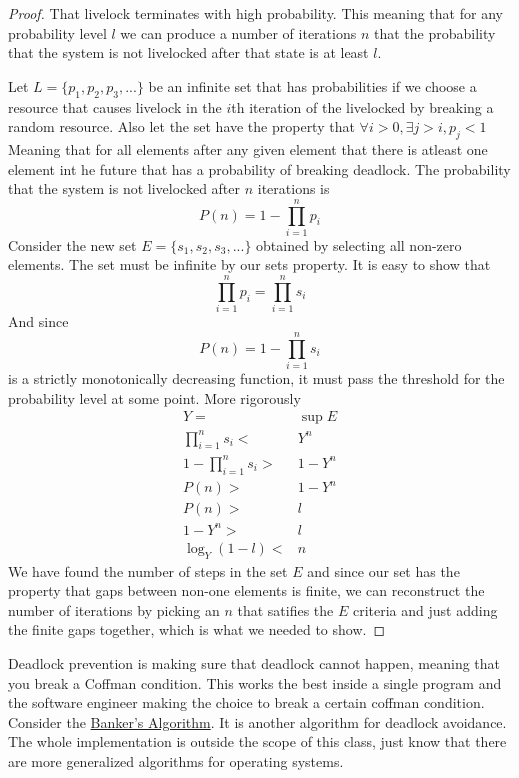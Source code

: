 \begin{proof} 
That livelock terminates with high probability. This meaning that for any probability level $l$ we can produce a number of iterations $n$ that the probability that the system is not livelocked after that state is at least $l$.

Let $L = \{p_1, p_2, p_3, ...\}$ be an infinite set that has probabilities if we choose a resource that causes livelock in the $i$th iteration of the livelocked by breaking a random resource. Also let the set have the property that $\forall i > 0, \exists j > i, p_j < 1$ Meaning that for all elements after any given element that there is atleast one element int he future that has a probability of breaking deadlock. The probability that the system is not livelocked after $n$ iterations is
\[
P(n) = 1 - \prod\limits_{i = 1}^{n}p_i
\]
Consider the new set $E = \{s_1, s_2, s_3, ...\}$ obtained by selecting all non-zero elements. The set must be infinite by our sets property. It is easy to show that 
\[
\prod\limits_{i = 1}^{n}p_i = \prod\limits_{i = 1}^{n}s_i
\]
And since
\[
P(n) = 1 - \prod\limits_{i = 1}^{n}s_i
\]
is a strictly monotonically decreasing function, it must pass the threshold for the probability level at some point. More rigorously
\begin{align*}
Y =& \sup E \\
\prod\limits_{i = 1}^{n}s_i <& Y^n \\
1 - \prod\limits_{i = 1}^{n}s_i >& 1 - Y^n \\
P(n) >& 1 - Y^n \\
P(n) >& l \\
1 - Y^n  >& l \\
\log_Y(1 - l) <& n
\end{align*}
We have found the number of steps in the set $E$ and since our set has the property that gaps between non-one elements is finite, we can reconstruct the number of iterations by picking an $n$ that satifies the $E$ criteria and just adding the finite gaps together, which is what we needed to show.
\end{proof}

Deadlock prevention is making sure that deadlock cannot happen, meaning that you break a Coffman condition. This works the best inside a single program and the software engineer making the choice to break a certain coffman condition. Consider the \href{https://en.wikipedia.org/wiki/Banker's_algorithm}{Banker's Algorithm}. It is another algorithm for deadlock avoidance. The whole implementation is outside the scope of this class, just know that there are more generalized algorithms for operating systems.

